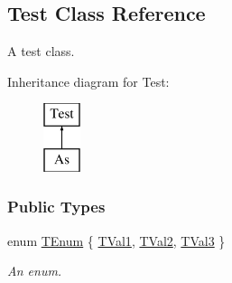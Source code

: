 \hypertarget{classTest}{\subsection{Test Class Reference}
\label{classTest}
}


A test class.  


Inheritance diagram for Test\-:\begin{figure}[H]
\begin{center}
\leavevmode
\includegraphics[height=2.000000cm]{classTest}
\end{center}
\end{figure}
\subsubsection*{Public Types}
\begin{DoxyCompactItemize}
\item 
enum \hyperlink{classTest_ad8d13fe56b896633273087859b89a1a3}{T\-Enum} \{ \hyperlink{classTest_ad8d13fe56b896633273087859b89a1a3abf8059769020a35c76df3d8b02521273}{T\-Val1}, 
\hyperlink{classTest_ad8d13fe56b896633273087859b89a1a3a38ab2f54365cee5e5561b04f32f053e3}{T\-Val2}, 
\hyperlink{classTest_ad8d13fe56b896633273087859b89a1a3ad63507e26f2168659722f1ef575b50b2}{T\-Val3}
 \}
\begin{DoxyCompactList}\small\item\em An enum. \end{DoxyCompactList}\end{DoxyCompactItemize}
